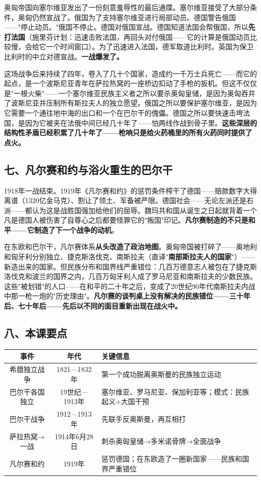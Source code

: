 \documentclass[a4paper,12pt]{ctexart}
\begin{document}
奥匈帝国向塞尔维亚发出了一份刻意羞辱性的最后通牒。塞尔维亚接受了大部分条件，奥匈仍然宣战了。俄国为了支持塞尔维亚进行局部动员。德国警告俄国——"停止动员。"俄国不停止。德国对俄国宣战。德国知道法国会帮俄国，所以\textbf{先打法国}（施里芬计划：迅速击败法国，再回头对付俄国——它的计算是俄国动员比较慢，会给它一个时间窗口）。为了迅速进入法国，德军取道比利时。英国为保卫比利时的中立对德宣战。\textbf{一战爆发了。}

这场战争后来持续了四年，卷入了几十个国家，造成约一千万士兵死亡——而它的起点，是一个波斯尼亚青年在萨拉热窝的一座桥边扣动了手枪的扳机。但这不仅仅是"一根火柴"——一个塞尔维亚民族主义者之所以要杀奥匈皇储，是因为奥匈吞并了波斯尼亚并压制所有斯拉夫人的独立愿望。俄国之所以要保护塞尔维亚，是因为它需要一个通往地中海的出口和一个在巴尔干的傀儡。德国之所以要快速击垮法国，是因为它被夹在法俄中间已经几十年了——怕两线作战到骨子里。\textbf{这些深层的结构性矛盾已经积累了几十年了——枪响只是给火药桶里的所有火药同时提供了点火。}

\subsection*{七、凡尔赛和约与浴火重生的巴尔干}

1918年一战结束。1919年《凡尔赛和约》的惩罚条件榨干了德国——赔款数字大得离谱（1320亿金马克）、割让了领土、军备被严限。德国社会——无论左派还是右派——都认为这是战胜国强加给他们的屈辱。魏玛共和国从诞生之日起就背着一个凡是德国人被伤害了自尊心之后都要怪罪它的"叛国"印记。\textbf{凡尔赛制造的不只是和平——它制造了下一个战争的动机}。

在东欧和巴尔干，凡尔赛体系\textbf{从头改造了政治地图}。奥匈帝国被打碎了——奥地利和匈牙利分别独立、捷克斯洛伐克、南斯拉夫（直译"\textbf{南部斯拉夫人的国家}"）——新造出来的国家。但民族分布和国界线严重错位：几百万德意志人被包在了捷克斯洛伐克和波兰的国界之内，几百万匈牙利人成了罗马尼亚和南斯拉夫的少数民族。这些"被划错"的人口——在和平的二十年之后，变成了20世纪90年代南斯拉夫内战中那一枪一炮的"历史理由"。\textbf{凡尔赛的谈判桌上没有解决的民族错位——三十年后、七十年后——先后以不同的面目重新出现在战火中。}

\subsection*{八、本课要点}

\begin{center}
\begin{tabular}{|c|c|p{7cm}|}
\hline
\textbf{事件} & \textbf{年代} & \textbf{关键信息} \\
\hline
希腊独立战争 & 1821—1832年 & 第一个成功脱离奥斯曼的民族独立运动 \\
\hline
巴尔干各国独立 & 19世纪—1913年 & 塞尔维亚、罗马尼亚、保加利亚等；模式：民族起义+大国干预 \\
\hline
巴尔干战争 & 1912—1913年 & 先联手反奥斯曼，再互相打 \\
\hline
萨拉热窝→一战 & 1914年6月28日 & 刺杀奥匈皇储→多米诺骨牌→全面战争 \\
\hline
凡尔赛和约 & 1919年 & 惩罚德国；在东欧造了一圈新国家——民族和国界严重错位 \\
\hline
\end{tabular}
\end{center}
\end{document}

